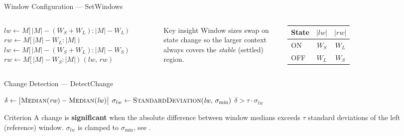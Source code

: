 \documentclass{beamer}
\begin{document}
\begin{frame}{Window Configuration --- SetWindows}
  \begin{columns}[T]
      \begin{algorithmic}[1]
            \State $\mathit{lw} \gets M[\,|M|{-}(W_S{+}W_L) : |M|{-}W_L\,)$
            \State $\mathit{rw} \gets M[\,|M|{-}W_L : |M|\,)$
          \Else
            \State $\mathit{lw} \gets M[\,|M|{-}(W_S{+}W_L) : |M|{-}W_S\,)$
            \State $\mathit{rw} \gets M[\,|M|{-}W_S : |M|\,)$
          \EndIf
          \State \Return $(\mathit{lw},\,\mathit{rw})$
        \EndFunction
      \end{algorithmic}

      \begin{block}{Key insight}
        Window sizes swap on state change so the larger context always
        covers the \emph{stable} (settled) region.
      \end{block}
      \vspace{0.5em}
      \begin{tabular}{lcc}
        \hline
        \textbf{State} & $|\mathit{lw}|$ & $|\mathit{rw}|$ \\
        \hline
        ON  & $W_S$ & $W_L$ \\
        OFF & $W_L$ & $W_S$ \\
        \hline
      \end{tabular}
  \end{columns}
\end{frame}

\begin{frame}{Change Detection --- DetectChange}
  \begin{algorithmic}[1]
      \State $\delta \gets \bigl|\Call{Median}{\mathit{rw}} -
                                 \Call{Median}{\mathit{lw}}\bigr|$
      \State $\sigma_{lw} \gets \Call{StandardDeviation}{\mathit{lw},\, \sigma_\text{min}}$
      \State \Return $\delta > \tau \cdot \sigma_{lw}$
    \EndFunction
  \end{algorithmic}
  \vspace{1em}
  \begin{block}{Criterion}
    A change is \textbf{significant} when the absolute difference
    between window medians exceeds $\tau$ standard deviations of the
    left (reference) window. $\sigma_{lw}$ is clamped to $\sigma_\text{min}$, see .
  \end{block}
\end{frame}
\end{document}
